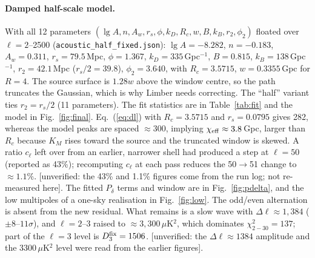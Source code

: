 \documentclass[10pt,twocolumn]{article}
\newcommand{\flag}[1]{\textsf{[unverified: #1]}}
\begin{document}
\paragraph{Damped half-scale model.} With all 12 parameters $(\lg A,n,A_w,r_s,\phi,k_D,R_c,w,B,k_B,r_2,\phi_2)$ floated over $\ell=2$--2500 (\texttt{acoustic\_half\_fixed.json}): $\lg A=-8.282$, $n=-0.183$, $A_w=0.311$, $r_s=79.5$\,Mpc, $\phi=1.367$, $k_D=335$\,Gpc$^{-1}$, $B=0.815$, $k_B=138$\,Gpc$^{-1}$, $r_2=42.1$\,Mpc ($r_s/2=39.8$), $\phi_2=3.640$, with $R_c=3.5715$, $w=0.3355$\,Gpc for $R=4$. The source surface is $1.28w$ above the window centre, so the path truncates the Gaussian, which is why Limber needs correcting. The ``half'' variant ties $r_2=r_s/2$ (11 parameters). The fit statistics are in Table~\ref{tab:fit} and the model in Fig.~\ref{fig:final}. Eq.~(\ref{eq:dl}) with $R_c=3.5715$ and $r_s=0.0795$ gives 282, whereas the model peaks are spaced $\approx300$, implying $\chi_{\rm eff}\approx3.8$\,Gpc, larger than $R_c$ because $K_M$ rises toward the source and the truncated window is skewed. A ratio $c_\ell$ left over from an earlier, narrower shell had produced a step at $\ell=50$ (reported as 43\%); recomputing $c_\ell$ at each pass reduces the 50$\to$51 change to $\approx1.1\%$. \flag{the 43\% and 1.1\% figures come from the run log; not re-measured here}. The fitted $P_\delta$ terms and window are in Fig.~\ref{fig:pdelta}, and the low multipoles of a one-sky realisation in Fig.~\ref{fig:low}. The odd/even alternation is absent from the new residual. What remains is a slow wave with $\Delta\ell\approx1{,}384$ ($\pm8$--$11\sigma$), and $\ell=2$--3 raised to $\approx3{,}300\,\mu$K$^2$, which dominates $\chi^2_{2-30}=137$; part of the $\ell=3$ level is $D^{\rm fix}_3=1506$. \flag{the $\Delta\ell\approx1384$ amplitude and the 3300\,$\mu$K$^2$ level were read from the earlier figures}.
\end{document}
